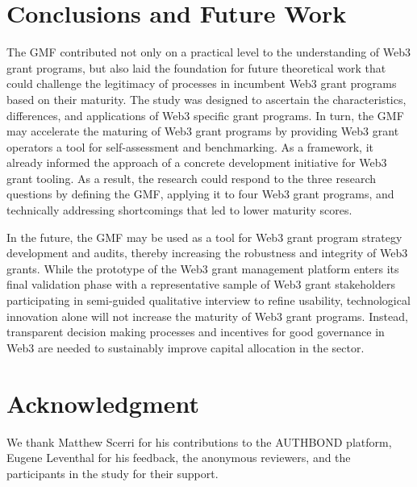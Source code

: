 \documentclass[conference]{IEEEtran}
\begin{document}
\section{Conclusions and Future Work}\label{sec_6}

The GMF contributed not only on a practical level to the understanding of Web3 grant programs, but also laid the foundation for future theoretical work that could challenge the legitimacy of processes in incumbent Web3 grant programs based on their maturity. The study was designed to ascertain the characteristics, differences, and applications of Web3 specific grant programs. In turn, the GMF may accelerate the maturing of Web3 grant programs by providing Web3 grant operators a tool for self-assessment and benchmarking. As a framework, it already informed the approach of a concrete development initiative for Web3 grant tooling. As a result, the research could respond to the three research questions by defining the GMF, applying it to four Web3 grant programs, and technically addressing shortcomings that led to lower maturity scores.

In the future, the GMF may be used as a tool for Web3 grant program strategy development and audits, thereby increasing the robustness and integrity of Web3 grants. While the prototype of the Web3 grant management platform enters its final validation phase with a representative sample of Web3 grant stakeholders participating in semi-guided qualitative interview to refine usability, technological innovation alone will not increase the maturity of Web3 grant programs. Instead, transparent decision making processes and incentives for good governance in Web3 are needed to sustainably improve capital allocation in the sector.

\section*{Acknowledgment}

We thank Matthew Scerri for his contributions to the AUTHBOND platform, Eugene Leventhal for his feedback, the anonymous reviewers, and the participants in the study for their support.



\end{document}
